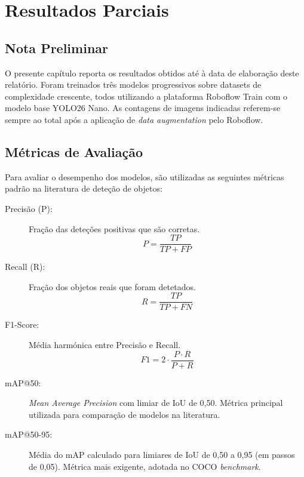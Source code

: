 \chapter{Resultados Parciais}
\label{chap:resultados}

\section{Nota Preliminar}

O presente capítulo reporta os resultados obtidos até à data de elaboração
deste relatório. Foram treinados três modelos progressivos sobre datasets
de complexidade crescente, todos utilizando a plataforma Roboflow Train
com o modelo base YOLO26 Nano. As contagens de imagens indicadas
referem-se sempre ao total após a aplicação de \textit{data augmentation}
pelo Roboflow.

\section{Métricas de Avaliação}

Para avaliar o desempenho dos modelos, são utilizadas as seguintes métricas
padrão na literatura de deteção de objetos:

\begin{description}
  \item[Precisão (P):] Fração das deteções positivas que são corretas.
    \[
      P = \frac{TP}{TP + FP}
    \]

  \item[Recall (R):] Fração dos objetos reais que foram detetados.
    \[
      R = \frac{TP}{TP + FN}
    \]

  \item[F1-Score:] Média harmónica entre Precisão e Recall.
    \[
      F1 = 2 \cdot \frac{P \cdot R}{P + R}
    \]

  \item[mAP@50:] \textit{Mean Average Precision} com limiar de IoU de 0,50.
    Métrica principal utilizada para comparação de modelos na literatura.

  \item[mAP@50-95:] Média do mAP calculado para limiares de IoU de 0,50
    a 0,95 (em passos de 0,05). Métrica mais exigente, adotada no COCO
    \textit{benchmark}.
\end{description}

